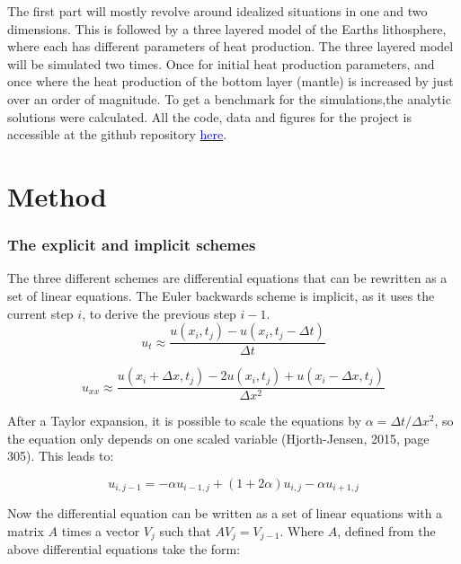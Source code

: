 \documentclass[10pt,a4paper]{article}
\begin{document}
\noindent The first part will mostly revolve around idealized situations in one and two dimensions. This is followed by a three layered model of the Earths lithosphere, where each has different parameters of heat production. The three layered model will be simulated two times. Once for initial heat production parameters, and once where the heat production of the bottom layer (mantle) is increased by just over an order of magnitude. To get a benchmark for the simulations,the analytic solutions were calculated. All the code, data and figures for the project is accessible at the github repository \href{https://github.com/VemundStenbekkThorkildsen/Assignment5}{\textcolor{blue}{here}}.  



\section*{Method}

\subsubsection*{The explicit and implicit schemes}
\noindent The three different schemes are differential equations that can be rewritten as a set of linear equations. The Euler backwards scheme is implicit, as it uses the current step $i$, to derive the previous step $i-1$.
\\
\begin{equation}
u_t \approx \frac{u(x_i,t_j) - u(x_i,t_j - \Delta t)}{\Delta t}
\end{equation}

\begin{equation}
u_{xx} \approx \frac{u(x_i + \Delta x,t_j) - 2u(x_i,t_j) + u(x_i - \Delta x,t_j)}{\Delta x^2}
\end{equation}

\noindent After a Taylor expansion, it is possible to scale the equations by $\alpha = \Delta t / \Delta x^2$, so the equation only depends on one scaled variable (Hjorth-Jensen, 2015, page 305). This leads to:

\begin{equation}
u_{i,j-1} = -\alpha u_{i-1,j} + (1 + 2\alpha)u_{i,j} - \alpha u_{i+1,j}
\end{equation}

\noindent Now the differential equation can be written as a set of linear equations with a matrix $A$ times a vector $V_j$ such that $AV_j = V_{j-1}$. Where $A$, defined from the above differential equations take the form:
\end{document}
